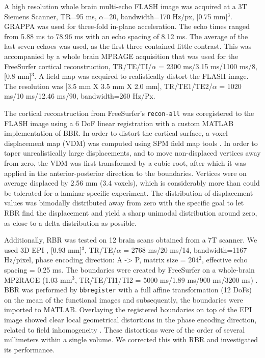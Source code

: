 A high resolution whole brain multi-echo FLASH image \citep{Haase1986} was acquired at a 3T Siemens Scanner, TR=95 ms, $\alpha$=20\textdegree, bandwidth=170 Hz/px, [0.75 mm]$^3$. GRAPPA was used for three-fold in-plane acceleration. The echo times ranged from 5.88 ms to 78.96 ms with an echo spacing of 8.12 ms. The average of the last seven echoes was used, as the first three contained little contrast. This was accompanied by a whole brain MPRAGE acquisition that was used for the FreeSurfer cortical reconstruction, TR/TE/TI/$\alpha$ = 2300 ms/3.15 ms/1100 ms/8\textdegree, [0.8 mm]$^3$. A field map was acquired to realistically distort the FLASH image. The resolution was [3.5 mm X 3.5 mm X 2.0 mm], TR/TE1/TE2/$\alpha$ = 1020 ms/10 ms/12.46 ms/90\textdegree, bandwidth=260 Hz/Px.

The cortical reconstruction from FreeSurfer's \texttt{recon-all} \citep{Dale1999} was coregistered to the FLASH image using a 6 DoF linear registration with a custom MATLAB implementation of BBR. In order to distort the cortical surface, a voxel displacement map (VDM) was computed using SPM field map tools \citep{Andersson2001}. 
In order to taper unrealistically large displacements, and to move non-displaced vertices away from zero, the VDM was first transformed by a cubic root, after which it was applied in the anterior-posterior direction to the boundaries. Vertices were on average displaced by 2.56 mm (3.4 voxels), which is considerably more than could be tolerated for a laminar specific experiment. The distribution of displacement values was bimodally distributed away from zero with the specific goal to let RBR find the displacement and yield a sharp unimodal distribution around zero, as close to a delta distribution as possible.

Additionally, RBR was tested on 12 brain scans obtained from a 7T scanner. We used 3D EPI \citep{Poser2010}, [0.93 mm]$^3$, TR/TE/$\alpha$ = 2768 ms/20 ms/14\textdegree, bandwidth=1167 Hz/pixel, phase encoding direction: A -> P, matrix size = 204$^2$, effective echo spacing = 0.25 ms. The boundaries were created by FreeSurfer on a whole-brain MP2RAGE (1.03 mm$^3$, TR/TE/TI1/TI2 = 5000 ms/1.89 ms/900 ms/3200 ms) \citep{Marques2010}. BBR was performed by \texttt{bbregister} with a full affine transformation (12 DoFs) on the mean of the functional images and subsequently, the boundaries were imported to MATLAB. Overlaying the registered boundaries on top of the EPI image showed clear local geometrical distortions in the phase encoding direction, related to field inhomogeneity \citep{Jezzard1995}. These distortions were of the order of several millimeters within a single volume. We corrected this with RBR and investigated its performance.

